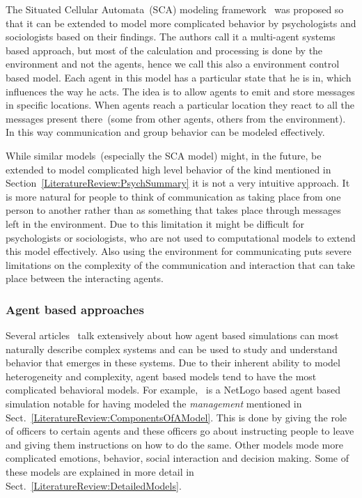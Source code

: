 The Situated Cellular Automata~(SCA) modeling framework~\cite{Bandini:2007fa} was proposed so that it can be extended to model more complicated behavior by psychologists and sociologists based on their findings. The authors call it a multi-agent systems based approach, but most of the calculation and processing is done by the environment and not the agents, hence we call this also a environment control based model. Each agent in this model has a particular state that he is in, which influences the way he acts. The idea is to allow agents to emit and store messages in specific locations. When agents reach a particular location they react to all the messages present there~(some from other agents, others from the environment). In this way communication and group behavior can be modeled effectively.

While similar models~(especially the SCA model) might, in the future, be extended to model complicated high level behavior of the kind mentioned in Section~\ref{LiteratureReview:PsychSummary} it is not a very intuitive approach. It is more natural for people to think of communication as taking place from one person to another rather than as something that takes place through messages left in the environment. Due to this limitation it might be difficult for psychologists or sociologists, who are not used to computational models to extend this model effectively. Also using the environment for communicating puts severe limitations on the complexity of the communication and interaction that can take place between the interacting agents.

\subsubsection{Agent based approaches}
Several articles~\cite{Epstein:1999vn,Bonabeau:2002um,Li:2008wt} talk extensively about how agent based simulations can most naturally describe complex systems and can be used to study and understand behavior that emerges in these systems. Due to their inherent ability to model heterogeneity and complexity, agent based models tend to have the most complicated behavioral models. For example,~\cite{AugustijnBeckers:2010cr} is a NetLogo based agent based simulation notable for having modeled the \emph{management} mentioned in Sect.~\ref{LiteratureReview:ComponentsOfAModel}. This is done by giving the role of officers to certain agents and these officers go about instructing people to leave and giving them instructions on how to do the same. Other models mode more complicated emotions, behavior, social interaction and decision making. Some of these models are explained in more detail in Sect.~\ref{LiteratureReview:DetailedModels}.

